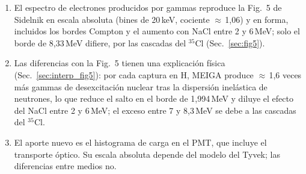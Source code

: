 \documentclass[11pt,a4paper]{article}
\begin{document}
\begin{enumerate}
\item El espectro de electrones producidos por gammas reproduce la Fig.~5 de Sidelnik en escala absoluta (bines de 20\,keV, cociente $\approx$\,1,06) y en forma, incluidos los bordes Compton y el aumento con NaCl entre 2 y 6\,MeV; solo el borde de 8,33\,MeV difiere, por las cascadas del $^{35}$Cl (Sec.~\ref{sec:fig5}).
\item Las diferencias con la Fig.~5 tienen una explicación física (Sec.~\ref{sec:interp_fig5}): por cada captura en H, MEIGA produce $\approx$\,1,6 veces más gammas de desexcitación nuclear tras la dispersión inelástica de neutrones, lo que reduce el salto en el borde de 1,994\,MeV y diluye el efecto del NaCl entre 2 y 6\,MeV; el exceso entre 7 y 8,3\,MeV se debe a las cascadas del $^{35}$Cl.
\item El aporte nuevo es el histograma de carga en el PMT, que incluye el transporte óptico. Su escala absoluta depende del modelo del Tyvek; las diferencias entre medios no.
\end{enumerate}
\appendix
\end{document}
